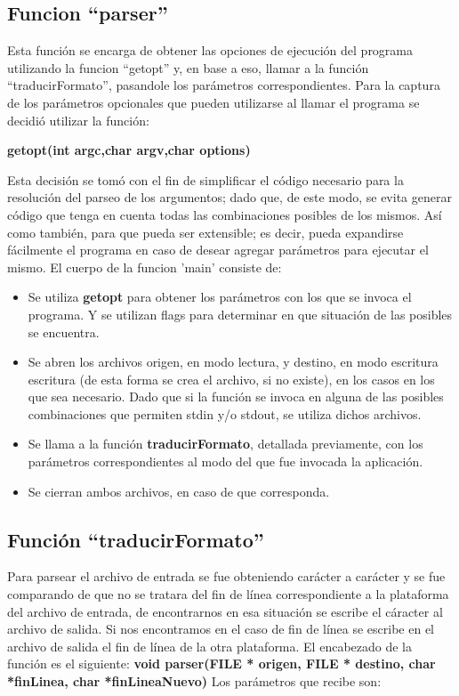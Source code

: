 \documentclass[a4paper,10pt]{article}
\begin{document}
  \subsection{Funcion ``parser''}
  Esta funci\'on se encarga de obtener las opciones de ejecuci\'on del programa utilizando la funcion ``getopt'' y, en base
  a eso, llamar a la funci\'on ``traducirFormato'', pasandole los par\'ametros correspondientes.
  \newline
  Para la captura de los par\'ametros opcionales que pueden utilizarse al 
  llamar el programa se decidi\'o utilizar la funci\'on:
  \begin{center}
    {\bf getopt(int argc,char\*\* argv,char\* options)}
  \end{center}
  Esta decisi\'on se tom\'o con el fin de simplificar el c\'odigo necesario para la resoluci\'on del parseo de los
  argumentos; dado que, de este modo, se evita generar c\'odigo que tenga
  en cuenta todas las combinaciones posibles de los mismos. As\'i como
  tambi\'en, para que pueda ser extensible; es decir, pueda expandirse
  f\'acilmente el programa en caso de desear agregar par\'ametros para
  ejecutar el mismo.
  El cuerpo de la funcion 'main' consiste de:
  \begin{itemize}
  \item Se utiliza {\bf getopt} para obtener los par\'ametros con los que se invoca el programa. Y se 
    utilizan flags para determinar en que situaci\'on de las posibles se encuentra.
  \item Se abren los archivos origen, en modo lectura, y destino, en modo escritura escritura (de esta
    forma se crea el archivo, si no existe), en los casos en los que sea necesario. Dado que si la funci\'on
    se invoca en alguna de las posibles combinaciones que permiten stdin y/o stdout, se utiliza dichos 
    archivos.
  \item Se llama a la funci\'on {\bf traducirFormato}, detallada previamente, con los par\'ametros 
    correspondientes al modo del que fue invocada la aplicaci\'on.
  \item Se cierran ambos archivos, en caso de que corresponda.
  \end{itemize}


  \subsection{Funci\'on ``traducirFormato''}
  Para parsear el archivo de entrada se fue obteniendo car\'acter a car\'acter y
  se fue comparando de que no se tratara del fin de l\'inea
  correspondiente a la plataforma del archivo de entrada, de
  encontrarnos en esa situaci\'on se escribe el c\'aracter al archivo de
  salida. Si nos encontramos en el caso de fin de l\'inea se escribe en el
  archivo de salida el fin de l\'inea de la otra plataforma. 
  El encabezado de la funci\'on es el siguiente:
  \newline
  {\bf void parser(FILE * origen, FILE * destino, char *finLinea, char *finLineaNuevo)}
  \newline
  Los par\'ametros que recibe son:
\end{document}
